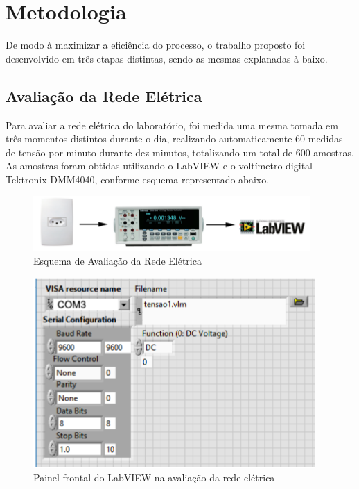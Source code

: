 \documentclass[14pt, oneside]{book}
\newcommand\tab[1][1cm]{\hspace*{#1}}
\theoremstyle{definition}
\begin{document}
         \chapter{Metodologia}
            \tab De modo à maximizar a eficiência do processo, o trabalho proposto foi desenvolvido
            em três etapas distintas, sendo as mesmas explanadas à baixo.
            \section{Avaliação da Rede Elétrica}
                \tab Para avaliar a rede elétrica do laboratório, foi medida uma mesma tomada em
                três momentos distintos durante o dia, realizando automaticamente $60$ medidas de tensão
                por minuto durante dez minutos, totalizando um total de $600$ amostras. As amostras foram
                obtidas utilizando o LabVIEW e o voltímetro digital Tektronix DMM4040, conforme esquema representado abaixo.
                
                \begin{figure}[H]
                    \centering
                    \includegraphics[scale = 0.8]{a.png}
                    \caption{Esquema de Avaliação da Rede Elétrica}
                    \label{avaliacaorede}
                \end{figure}
                
                \begin{figure}[H]
                    \centering
                    \includegraphics[scale = 0.8]{b.png}
                    \caption{Painel frontal do LabVIEW na avaliação da rede elétrica}
                    \label{frontallv}
                \end{figure}
                
\end{document}
